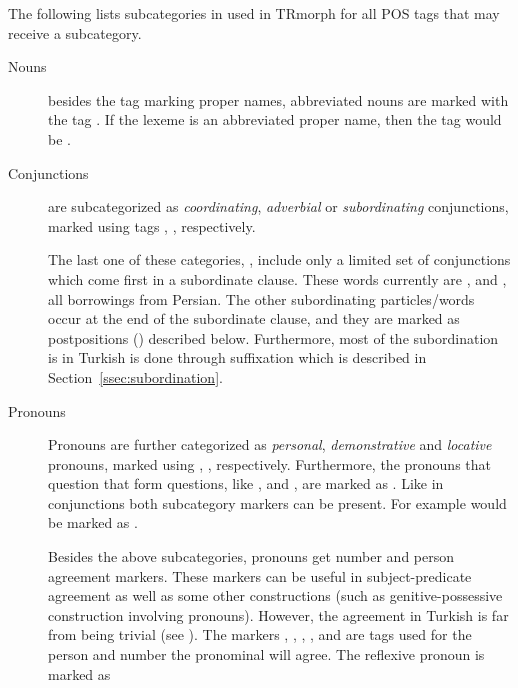 \documentclass[twocolumn]{article}
\begin{document}
The following lists subcategories in used in TRmorph for all POS tags
that may receive a subcategory.

\begin{description}
\item[Nouns] besides the tag  marking proper names, 
abbreviated nouns are marked with the tag . If the 
lexeme is an abbreviated proper name, then the tag would be 
. 

\item[Conjunctions] are subcategorized as
\emph{coordinating}, \emph{adverbial} or \emph{subordinating} 
conjunctions, marked using tags , ,
 respectively. 

The last one of these categories, , include only a
limited set of conjunctions which come first in a subordinate clause.
These words currently are ,  and , all
borrowings from Persian. The other subordinating particles/words occur
at the end of the subordinate clause, and they are marked as
postpositions () described below.  Furthermore, most
of the subordination is in Turkish is done through suffixation which
is described in Section~\ref{ssec:subordination}.

\item[Pronouns] Pronouns are further categorized as \emph{personal},
\emph{demonstrative} and \emph{locative} pronouns, marked using
, ,  
respectively. Furthermore, the pronouns that question that form
questions, like , and , are
marked as . Like in conjunctions both subcategory
markers can be present. For example  would be marked
as .

Besides the above subcategories, pronouns get number and person
agreement markers. These markers can be useful in subject-predicate
agreement as well as some other constructions (such as
genitive-possessive construction involving pronouns). However, the
agreement in Turkish is far from being trivial (see
\cite[pp.116--122]{goksel2005}). The markers 
,
,
,
,
 and
 are tags used for the person and number the
pronominal will agree. The reflexive pronoun  is
marked as 


\end{description}
\end{document}
